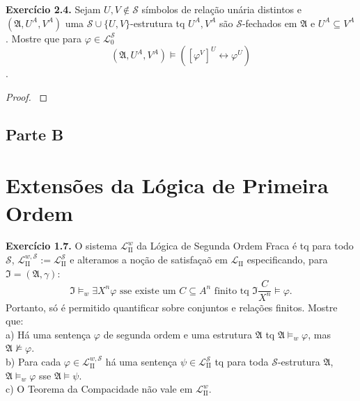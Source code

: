 \documentclass[11pt]{article}
\newcommand{\mc}[1]{\mathcal{#1}}
\newcommand{\mf}[1]{\mathfrak{#1}}
\begin{document}
\begin{shaded}
\textbf{Exercício 2.4.} Sejam $U,V\notin\mc{S}$ símbolos de relação unária distintos e $(\mf{A},U^A, V^A)$ uma $\mc{S}\cup\{U,V\}$-estrutura tq $U^A,V^A$ são $\mc{S}$-fechados em $\mf{A}$ e $U^A\subseteq V^A$. Mostre que para $\varphi\in\mc{L}_0^\mc{S}$
$$(\mf{A},U^A,V^A)\vDash([\varphi^V]^U\leftrightarrow\varphi^U)$$.
\end{shaded}

\begin{proof}
    \textbf{\color{red}{PENDENTE}}
\end{proof}

\textbf{\color{red}{PENDENTE}}

\begin{center}
    \section*{Parte B}
\end{center}

\section{Extensões da Lógica de Primeira Ordem}

\begin{shaded}
\textbf{Exercício 1.7.} O sistema $\mathscr{L}_\text{II}^w$ da Lógica de Segunda Ordem Fraca é tq para todo $\mc{S}$, $\mc{L}_\text{II}^{w,\mc
{S}}:=\mc{L}_\text{II}^\mc{S}$ e alteramos a noção de satisfaçaõ em $\mathscr{L}_\text{II}$ especificando, para $\mf{I}=(\mf{A},\gamma)$:
$$\mf{I}\vDash_w\exists X^n\varphi\text{ sse existe um }C\subseteq A^n\text{ finito tq }\mf{I}\frac{C}{X^n}\vDash\varphi.$$
Portanto, só é permitido quantificar sobre conjuntos e relações finitos. Mostre que:\\
a) Há uma sentença $\varphi$ de segunda ordem e uma estrutura $\mf{A}$ tq $\mf{A}\vDash_w\varphi$, mas $\mf{A}\nvDash\varphi$.\\
b) Para cada $\varphi\in\mc{L}_\text{II}^{w,\mc{S}}$ há uma sentença $\psi\in\mc{L}_\text{II}^\mc{S}$ tq para toda $\mc{S}$-estrutura $\mf{A}$, $\mf{A}\vDash_w\varphi$ sse $\mf{A}\vDash\psi$.\\
c) O Teorema da Compacidade não vale em $\mathscr{L}_\text{II}^w$.
\end{shaded}
\end{document}
